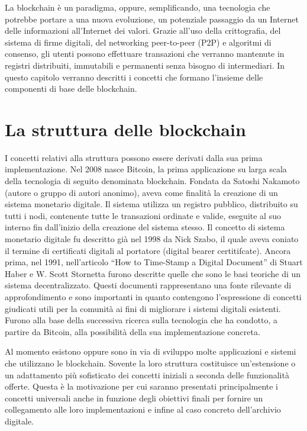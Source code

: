 La blockchain è un paradigma, oppure, semplificando, una tecnologia che potrebbe portare a una nuova evoluzione, un potenziale passaggio da un Internet delle informazioni all’Internet dei valori. Grazie all’uso della crittografia, del sistema di firme digitali, del networking peer-to-peer (P2P) e algoritmi di consenso, gli utenti possono effettuare transazioni che verranno mantenute in registri distribuiti, immutabili e permanenti senza bisogno di intermediari. In questo capitolo verranno descritti i concetti che formano l’insieme delle componenti di base delle blockchain.

\section{La struttura delle blockchain}

I concetti relativi alla struttura possono essere derivati dalla sua prima implementazione. Nel 2008 nasce Bitcoin, la prima applicazione su larga scala della tecnologia di seguito denominata blockchain. Fondata da Satoshi Nakamoto (autore o gruppo di autori anonimo), aveva come finalità la creazione di un sistema monetario digitale. Il sistema utilizza un registro pubblico, distribuito su tutti i nodi, contenente tutte le transazioni ordinate e valide, eseguite al suo interno fin dall’inizio della creazione del sistema stesso. Il concetto di sistema monetario digitale fu descritto già nel 1998 da Nick Szabo, il quale aveva coniato il termine di certificati digitali al portatore (digital bearer certitifcate). Ancora prima, nel 1991, nell’articolo “How to Time-Stamp a Digital Document” di Stuart Haber e W. Scott Stornetta furono descritte quelle che sono le basi teoriche di un sistema decentralizzato. Questi documenti rappresentano una fonte rilevante di approfondimento e sono importanti in quanto contengono l’espressione di concetti giudicati utili per la comunità ai fini di migliorare i sistemi digitali esistenti. Furono alla base della successiva ricerca sulla tecnologia che ha condotto, a partire da Bitcoin, alla possibilità della sua implementazione concreta.

Al momento esistono oppure sono in via di sviluppo molte applicazioni e sistemi che utilizzano le blockchain. Sovente la loro struttura costituisce un’estensione o un adattamento più sofisticato dei concetti iniziali a seconda delle funzionalità offerte. Questa è la motivazione per cui saranno presentati principalmente i concetti universali anche in funzione degli obiettivi finali per fornire un collegamento alle loro implementazioni e infine al caso concreto dell’archivio digitale.

